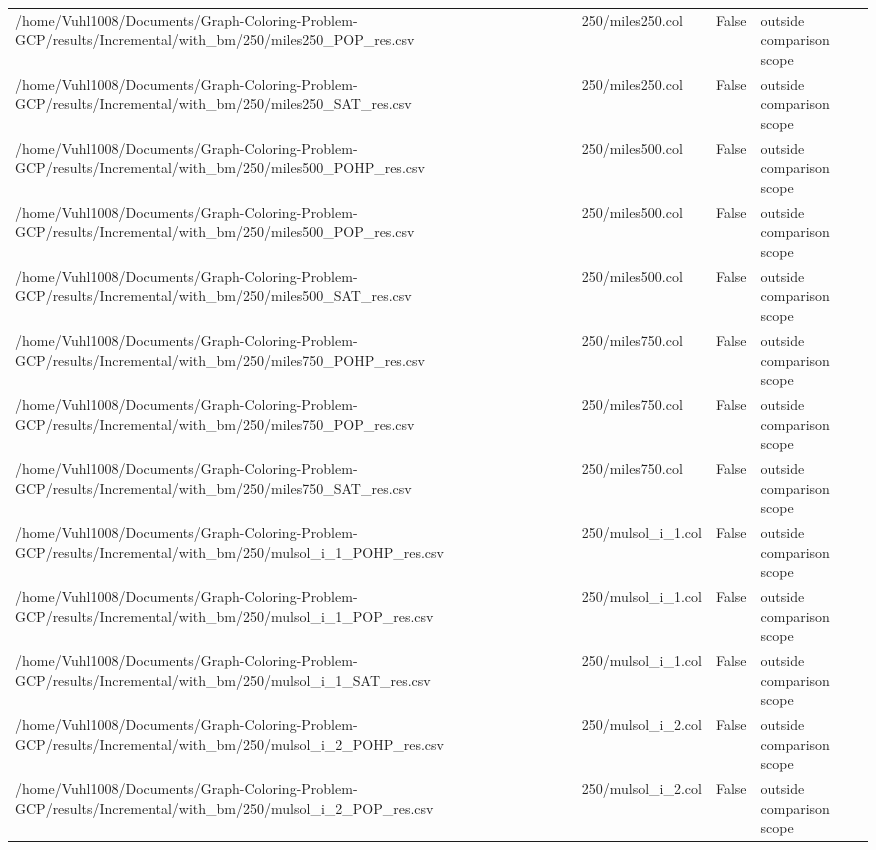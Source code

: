 \begin{table}[htbp]
\begin{tabular}{llll}
/home/Vuhl1008/Documents/Graph-Coloring-Problem-GCP/results/Incremental/with\_bm/250/miles250\_POP\_res.csv & 250/miles250.col & False & outside comparison scope \\
/home/Vuhl1008/Documents/Graph-Coloring-Problem-GCP/results/Incremental/with\_bm/250/miles250\_SAT\_res.csv & 250/miles250.col & False & outside comparison scope \\
/home/Vuhl1008/Documents/Graph-Coloring-Problem-GCP/results/Incremental/with\_bm/250/miles500\_POHP\_res.csv & 250/miles500.col & False & outside comparison scope \\
/home/Vuhl1008/Documents/Graph-Coloring-Problem-GCP/results/Incremental/with\_bm/250/miles500\_POP\_res.csv & 250/miles500.col & False & outside comparison scope \\
/home/Vuhl1008/Documents/Graph-Coloring-Problem-GCP/results/Incremental/with\_bm/250/miles500\_SAT\_res.csv & 250/miles500.col & False & outside comparison scope \\
/home/Vuhl1008/Documents/Graph-Coloring-Problem-GCP/results/Incremental/with\_bm/250/miles750\_POHP\_res.csv & 250/miles750.col & False & outside comparison scope \\
/home/Vuhl1008/Documents/Graph-Coloring-Problem-GCP/results/Incremental/with\_bm/250/miles750\_POP\_res.csv & 250/miles750.col & False & outside comparison scope \\
/home/Vuhl1008/Documents/Graph-Coloring-Problem-GCP/results/Incremental/with\_bm/250/miles750\_SAT\_res.csv & 250/miles750.col & False & outside comparison scope \\
/home/Vuhl1008/Documents/Graph-Coloring-Problem-GCP/results/Incremental/with\_bm/250/mulsol\_i\_1\_POHP\_res.csv & 250/mulsol\_i\_1.col & False & outside comparison scope \\
/home/Vuhl1008/Documents/Graph-Coloring-Problem-GCP/results/Incremental/with\_bm/250/mulsol\_i\_1\_POP\_res.csv & 250/mulsol\_i\_1.col & False & outside comparison scope \\
/home/Vuhl1008/Documents/Graph-Coloring-Problem-GCP/results/Incremental/with\_bm/250/mulsol\_i\_1\_SAT\_res.csv & 250/mulsol\_i\_1.col & False & outside comparison scope \\
/home/Vuhl1008/Documents/Graph-Coloring-Problem-GCP/results/Incremental/with\_bm/250/mulsol\_i\_2\_POHP\_res.csv & 250/mulsol\_i\_2.col & False & outside comparison scope \\
/home/Vuhl1008/Documents/Graph-Coloring-Problem-GCP/results/Incremental/with\_bm/250/mulsol\_i\_2\_POP\_res.csv & 250/mulsol\_i\_2.col & False & outside comparison scope \\

\end{tabular}
\end{table}
